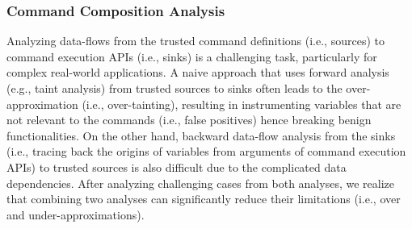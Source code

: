 \subsubsection{Command Composition Analysis}
\label{subsubsec:composition}
Analyzing data-flows from the trusted command definitions (i.e., sources) to command execution APIs (i.e., sinks) is a challenging task, particularly for complex real-world applications.
A naive approach that uses forward analysis (e.g., taint analysis) from trusted sources to sinks often leads to the over-approximation (i.e., over-tainting),  resulting in instrumenting variables that are not relevant to the commands (i.e., false positives) hence breaking benign functionalities. %
On the other hand, backward data-flow analysis from the sinks (i.e., tracing back the origins of variables from arguments of command execution APIs) to trusted sources is also difficult due to the complicated data dependencies.
After analyzing challenging cases from both analyses, we realize that combining two analyses can significantly reduce their limitations (i.e., over and under-approximations).





